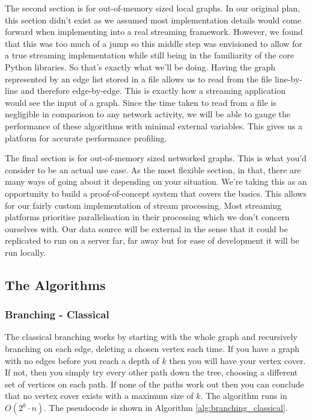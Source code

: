 The second section is for out-of-memory sized local graphs. In our original
plan, this section didn't exist as we assumed most implementation details would
come forward when implementing into a real streaming framework. However, we
found that this was too much of a jump so this middle step was envisioned to
allow for a true streaming implementation while still being in the familiarity
of the core Python libraries. So that's exactly what we'll be doing. Having the
graph represented by an edge list stored in a file allows us to read from the
file line-by-line and therefore edge-by-edge. This is exactly how a streaming
application would see the input of a graph. Since the time taken to read from a
file is negligible in comparison to any network activity, we will be able to
gauge the performance of these algorithms with minimal external variables. This
gives us a platform for accurate performance profiling.

The final section is for out-of-memory sized networked graphs. This is what
you'd consider to be an actual use case. As the most flexible section, in that,
there are many ways of going about it depending on your situation. We're taking
this as an opportunity to build a proof-of-concept system that covers the
basics. This allows for our fairly custom implementation of stream processing.
Most streaming platforms prioritise parallelisation in their processing which
we don't concern ourselves with. Our data source will be external in the sense
that it could be replicated to run on a server far, far away but for ease of
development it will be run locally.

\subsection{The Algorithms}

\subsubsection{Branching - Classical}

The classical branching works by starting with the whole graph and recursively
branching on each edge, deleting a chosen vertex each time. If you have a graph
with no edges before you reach a depth of \(k\) then you will have your vertex
cover. If not, then you simply try every other path down the tree, choosing a
different set of vertices on each path. If none of the paths work out then you
can conclude that no vertex cover exists with a maximum size of \(k\). The
algorithm runs in \(O(2^k \cdot n)\). The pseudocode is shown in Algorithm
\ref{alg:branching_classical}.


